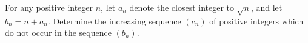 For any positive integer $n$, let $a_n$ denote the closest integer to $\sqrt{n}$, and let $b_n=n+a_n$. Determine the increasing sequence $(c_n)$ of positive integers which do not occur in the sequence $(b_n)$.